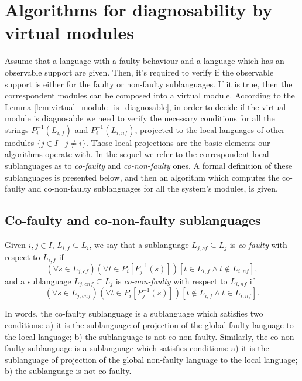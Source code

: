 \section{Algorithms for diagnosability by virtual modules}
\label{sec:algorithms}

Assume that a language with a faulty behaviour and a language which has an
observable support are given. Then, it's required to verify if the observable
support is either for the faulty or non-faulty sublanguages. If it is true, then the
correspondent modules can be composed into a virtual module.
According to the Lemma \ref{lem:virtual_module_is_diagnosable}, in order to
decide if the virtual module is diagnosable we need to verify the necessary
conditions for all the strings $P_i^{-1}(L_{i,f})$ and $P_i^{-1}(L_{i,nf})$,
projected to the local languages of other modules $\{j \in I\mid j \neq i\}$.
Those local projections are the basic elements our algorithms operate with. In the sequel we
refer to the correspondent local sublanguages as to \emph{co-faulty} and
\emph{co-non-faulty} ones. A formal definition of these sublanguages is
presented below, and then an algorithm which computes the co-faulty
and co-non-faulty sublanguages for all the system's modules, is given. 

\subsection{Co-faulty and co-non-faulty sublanguages}

\begin{definition}
\label{def:co-faulty}
Given $i, j \in I$, $L_{i,f} \subseteq L_i$,
we say that a sublanguage $L_{j,cf} \subseteq L_j$ is \emph{co-faulty} with
respect to $L_{i,f}$ if 
$$
	(\forall s \in L_{j,cf})(\forall t \in P_i[P_j^{-1}(s)])
	\left[
		t \in L_{i,f} \land t \not \in L_{i,nf}   
	\right],
$$ 
and a sublanguage $L_{j,cnf} \subseteq L_j$ is
\emph{co-non-faulty} with respect to $L_{i,nf}$ if 
$$
	(\forall s \in L_{j,cnf})(\forall t \in P_i[P_j^{-1}(s)])
	\left[
		t \not \in L_{i,f} \land t \in L_{i,nf}   
	\right].
$$ 
\end{definition}

In words, the co-faulty sublanguage is a sublanguage which satisfies two
conditions:
a) it is the sublanguage of projection of the global faulty language
to the local language; b) the sublanguage is not co-non-faulty.
Similarly, the co-non-faulty sublanguage is a sublanguage which satisfies
conditions:
a) it is the sublanguage of projection of the global non-faulty language
to the local language; b) the sublanguage is not co-faulty.

